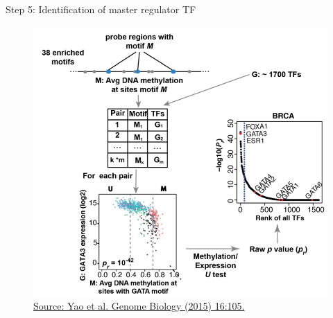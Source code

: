 \documentclass[slidestop,compress,11pt,xcolor=dvipsnames]{beamer}
\begin{document}
\begin{frame}{Step 5: Identification of master regulator TF}
\vspace*{-0.5cm}
 \begin{figure}
  \centering
  \includegraphics[width=0.75\linewidth]{ELMER/tfrank.png}{\tiny{\\ \vspace{-0.2cm}\href{https://genomebiology.biomedcentral.com/articles/10.1186/s13059-015-0668-3}{Source: Yao et al. Genome Biology (2015) 16:105.}}}
 \end{figure}
\end{frame}


\end{document}
